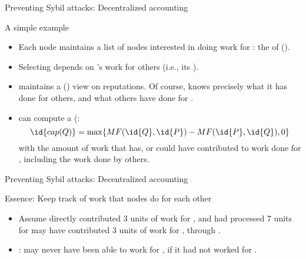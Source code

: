 \begin{slide}{Preventing Sybil attacks: Decentralized accounting}
  \begin{exampleblock}{A simple example}
    \begin{itemize}
    \item Each node  maintains a list of nodes interested in doing work for : the 
      of  ().
    \item Selecting  depends on 's work for others (i.e., its
      ).
    \item {} maintains a () view on reputations. Of course,  knows precisely what
      it has done for others, and what others have done for .
    \item {} can compute a  (:
      \[
      \id{cap(Q)} = \max\{MF(\id{Q},\id{P}) - MF(\id{P},\id{Q}),0\}
      \]
      with  the amount of work that  has, or could have contributed to work
      done for , including the work done by others.
    \end{itemize}
  \end{exampleblock}
\end{slide}
\begin{slide}{Preventing Sybil attacks: Decentralized accounting}
  \begin{block}{Essence: Keep track of work that nodes do for each other}
    \begin{itemize}
    \item Assume  directly contributed 3 units of work for , and  had processed 7 units for
       \mathexpr{\Rightarrow}  may have contributed 3 units of work for , through .
    \item {}:  may never have been able to work for , if it had not worked for
      .
    \end{itemize}
  \end{block}
\end{slide}

